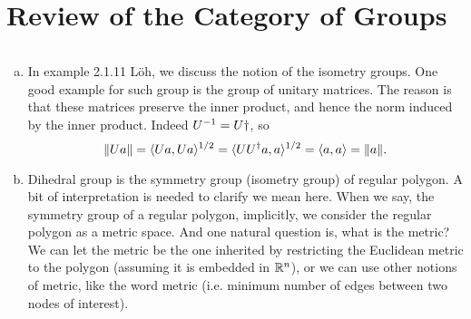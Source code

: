 \chapter{Review of the Category of Groups}

\begin{summary}
	$  $\\
	\begin{enumerate}[(a)]
		\item In example 2.1.11 L\"{o}h, we discuss the notion of the isometry groups. One good example for such group is the group of unitary matrices. The reason is that these matrices preserve the inner product, and hence the norm induced by the inner product. Indeed $ U^{-1} = U\dagger $, so
		\[ \norm{U a} = \langle Ua, Ua \rangle^{1/2} = \langle UU^\dagger a, a\rangle^{1/2} = \langle a,a \rangle =  \norm{a}. \]
		
		
		\item Dihedral group is the symmetry group (isometry group) of regular polygon. A bit of interpretation is needed to clarify we mean here. When we say, the symmetry group of a regular polygon, implicitly, we consider the regular polygon as a metric space. And one natural question is, what is the metric? We can let the metric be the one inherited by restricting the Euclidean metric to the polygon (assuming it is embedded in $ \mathbb{R}^n $), or we can use other notions of metric, like the word metric (i.e. minimum number of edges between two nodes of interest). 
		
	\end{enumerate}
\end{summary}